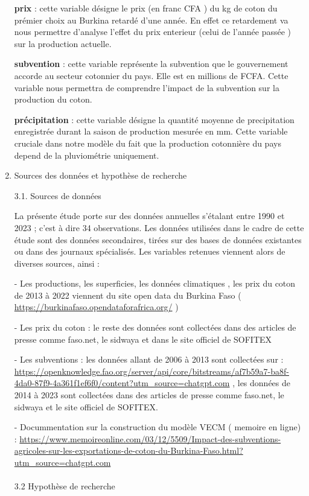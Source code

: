 \documentclass[
  letterpaper,
  DIV=11,
  numbers=noendperiod]{scrartcl}
\makeatletter
\let\oldparagraph\paragraph
\renewcommand{\paragraph}{
    \@ifstar
      \xxxParagraphStar
      \xxxParagraphNoStar
  }
\newcommand{\xxxParagraphStar}[1]{\oldparagraph*{#1}\mbox{}}
\newcommand{\xxxParagraphNoStar}[1]{\oldparagraph{#1}\mbox{}}
\makeatother
\begin{document}
\begin{enumerate}
  \textbf{prix} : cette variable désigne le prix (en franc CFA ) du kg
  de coton du prémier choix au Burkina retardé d'une année. En effet ce
  retardement va nous permettre d'analyse l'effet du prix enterieur
  (celui de l'année passée ) sur la production actuelle.

  \textbf{subvention} : cette variable représente la subvention que le
  gouvernement accorde au secteur cotonnier du pays. Elle est en
  millions de FCFA. Cette variable nous permettra de comprendre l'impact
  de la subvention sur la production du coton.

  \textbf{précipitation} : cette variable désigne la quantité moyenne de
  precipitation enregistrée durant la saison de production mesurée en
  mm. Cette variable cruciale dans notre modèle du fait que la
  production cotonnière du pays depend de la pluviométrie uniquement.
\item
  Sources des données et hypothèse de recherche

  3.1. Sources de données

  La présente étude porte sur des données annuelles s'étalant entre 1990
  et 2023 ; c'est à dire 34 observations. Les données utilisées dans le
  cadre de cette étude sont des données secondaires, tirées sur des
  bases de données existantes ou dans des journaux spécialisés. Les
  variables retenues viennent alors de diverses sources, ainsi :

  - Les productions, les superficies, les données climatiques , les prix
  du coton de 2013 à 2022 viennent du site open data du Burkina Faso (
  \url{https://burkinafaso.opendataforafrica.org/} )

  - Les prix du coton : le reste des données sont collectées dans des
  articles de presse comme faso.net, le sidwaya et dans le site officiel
  de SOFITEX

  - Les subventions : les données allant de 2006 à 2013 sont collectées
  sur :
  \url{https://openknowledge.fao.org/server/api/core/bitstreams/af7b59a7-ba8f-4da0-87f9-4a361f1ef6f0/content?utm_source=chatgpt.com}
  , les données de 2014 à 2023 sont collectées dans des articles de
  presse comme faso.net, le sidwaya et le site officiel de SOFITEX.

  - Docummentation sur la construction du modèle VECM ( memoire en
  ligne) :
  \url{https://www.memoireonline.com/03/12/5509/Impact-des-subventions-agricoles-sur-les-exportations-de-coton-du-Burkina-Faso.html?utm_source=chatgpt.com}

  \paragraph{3.2 Hypothèse de
  recherche}\label{hypothuxe8se-de-recherche}


\end{enumerate}
\end{document}
